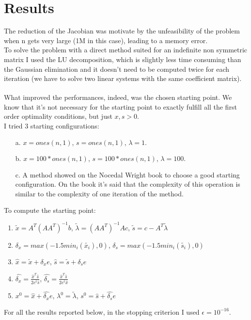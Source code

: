 \documentclass[]{article}
\begin{document}
\section{Results}
The reduction of the Jacobian was motivate by the unfeasibility of the problem when n gets very large (1M in this case), leading to a memory error.\\
To solve the problem with a direct method suited for an indefinite non symmetric matrix I used the LU decomposition, which is slightly less time consuming than the Gaussian elimination and it doesn't need to be computed twice for each iteration (we have to solve two linear systems with the same coefficient matrix).\\\\
What improved the performances, indeed, was the chosen starting point. We know that it's not necessary for the starting point to exactly fulfill all the first order optimality conditions, but just $x, s > 0$.\\
I tried 3 starting configurations:
\begin{enumerate}
	\item [a.]$x=ones(n,1)$, $s=ones(n,1)$, $\lambda = 1$.
	\item [b.]$x=100*ones(n,1)$, $s=100*ones(n,1)$,
	 $\lambda = 100$.
	 \item [c.] A method showed on the Nocedal Wright book to choose a good starting configuration. On the book it's said that the complexity of this operation is similar to the complexity of one iteration of the method.
\end{enumerate} 
To compute the starting point:
\begin{enumerate}
	\item $\tilde{x} = A^T(AA^T)^{-1}b$, $\tilde{\lambda} = (AA^T)^{-1}Ac$, $\tilde{s} = c-A^T\tilde{\lambda}$
	\item $\delta_x=max(-1.5min_i(\tilde{x_i}),0)$, $\delta_s=max(-1.5min_i(\tilde{s_i}),0)$
	\item $\hat{x} = \tilde{x} + \delta_xe$, $\hat{s} = \tilde{s} + \delta_se$
	\item $\hat{\delta_x}=\frac{\hat{x}^T\hat{s}}{2e^t\hat{s}}$, $\hat{\delta_s}=\frac{\hat{x}^T\hat{s}}{2e^t\hat{x}}$
	\item $x^0 = \hat{x} + \hat{\delta_x}e$, $\lambda^0=\tilde{\lambda}$, $s^0 = \hat{s} + \hat{\delta_s}e$
\end{enumerate}
For all the results reported below, in the stopping criterion I used $\epsilon=10^{-16}$.
\pagebreak
\end{document}
